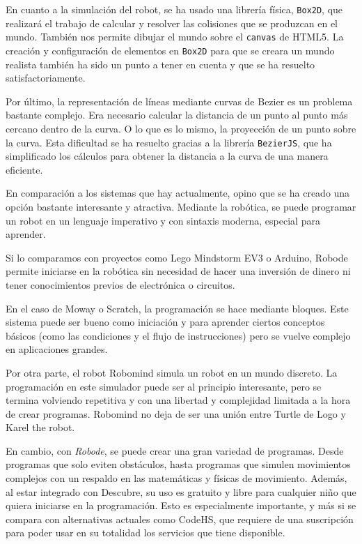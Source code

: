 
En cuanto a la simulación del robot, se ha usado una librería física, \texttt{Box2D}, que realizará el trabajo de calcular y resolver las colisiones que se produzcan en el mundo. También nos permite dibujar el mundo sobre el \texttt{canvas} de HTML5. La creación y configuración de elementos en \texttt{Box2D} para que se creara un mundo realista también ha sido un punto a tener en cuenta y que se ha resuelto satisfactoriamente. 

Por último, la representación de líneas mediante curvas de Bezier es un problema bastante complejo. Era necesario calcular la distancia de un punto al punto más cercano dentro de la curva. O lo que es lo mismo, la proyección de un punto sobre la curva. Esta dificultad se ha resuelto gracias a la librería \texttt{BezierJS}, que ha simplificado los cálculos para obtener la distancia a la curva de una manera eficiente. 


En comparación a los sistemas que hay actualmente, opino que se ha creado una opción bastante interesante y atractiva. Mediante la robótica, se puede programar un robot en un lenguaje imperativo y con sintaxis moderna, especial para aprender. 

Si lo comparamos con proyectos como Lego Mindstorm EV3 o Arduino, Robode permite iniciarse en la robótica sin necesidad de hacer una inversión de dinero ni tener conocimientos previos de electrónica o circuitos.

En el caso de Moway o Scratch, la programación se hace mediante bloques. Este sistema puede ser bueno como iniciación y para aprender ciertos conceptos básicos (como las condiciones y el flujo de instrucciones) pero se vuelve complejo en aplicaciones grandes. 

Por otra parte, el robot Robomind simula un robot en un mundo discreto. La programación en este simulador puede ser al principio interesante, pero se termina volviendo repetitiva y con una libertad y complejidad limitada a la hora de crear programas. Robomind no deja de ser una unión entre Turtle de Logo y Karel the robot. 

En cambio, con \emph{Robode}, se puede crear una gran variedad de programas. Desde programas que solo eviten obstáculos, hasta programas que simulen movimientos complejos con un respaldo en las matemáticas y físicas de movimiento. Además, al estar integrado con Descubre, su uso es gratuito y libre para cualquier niño que quiera iniciarse en la programación. Esto es especialmente importante, y más si se compara con alternativas actuales como CodeHS, que requiere de una suscripción para poder usar en su totalidad los servicios que tiene disponible.




